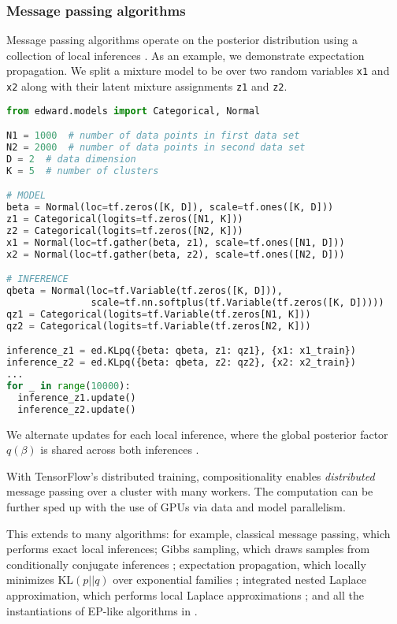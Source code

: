 \subsubsection{Message passing algorithms}

Message passing algorithms operate on the posterior distribution using
a collection of local inferences \citep{koller2009probabilistic}.
As an example, we demonstrate expectation propagation. We split a
mixture model to be over two random variables \texttt{x1} and
\texttt{x2} along with their latent mixture assignments \texttt{z1}
and \texttt{z2}.

\begin{lstlisting}[language=Python]
from edward.models import Categorical, Normal

N1 = 1000  # number of data points in first data set
N2 = 2000  # number of data points in second data set
D = 2  # data dimension
K = 5  # number of clusters

# MODEL
beta = Normal(loc=tf.zeros([K, D]), scale=tf.ones([K, D]))
z1 = Categorical(logits=tf.zeros([N1, K]))
z2 = Categorical(logits=tf.zeros([N2, K]))
x1 = Normal(loc=tf.gather(beta, z1), scale=tf.ones([N1, D]))
x2 = Normal(loc=tf.gather(beta, z2), scale=tf.ones([N2, D]))

# INFERENCE
qbeta = Normal(loc=tf.Variable(tf.zeros([K, D])),
               scale=tf.nn.softplus(tf.Variable(tf.zeros([K, D]))))
qz1 = Categorical(logits=tf.Variable(tf.zeros[N1, K]))
qz2 = Categorical(logits=tf.Variable(tf.zeros[N2, K]))

inference_z1 = ed.KLpq({beta: qbeta, z1: qz1}, {x1: x1_train})
inference_z2 = ed.KLpq({beta: qbeta, z2: qz2}, {x2: x2_train})
...
for _ in range(10000):
  inference_z1.update()
  inference_z2.update()
\end{lstlisting}

We alternate updates for each local inference, where the global
posterior factor $q(\beta)$ is shared across both inferences
\citep{gelman2017expectation}.

With TensorFlow's distributed training, compositionality
enables \emph{distributed} message passing over a cluster with many
workers. The computation can be further sped up with the use of GPUs
via data and model parallelism.

This extends to many algorithms: for example,
classical message passing, which performs exact local inferences;
Gibbs sampling, which draws samples from conditionally conjugate
inferences \citep{geman1984stochastic};
expectation propagation, which locally minimizes
$\text{KL}(p || q)$ over exponential families \citep{minka2001expectation};
integrated nested Laplace
approximation, which performs local Laplace approximations
\citep{rue2009approximate};
and
all the instantiations of EP-like algorithms in
\citet{gelman2017expectation}.

